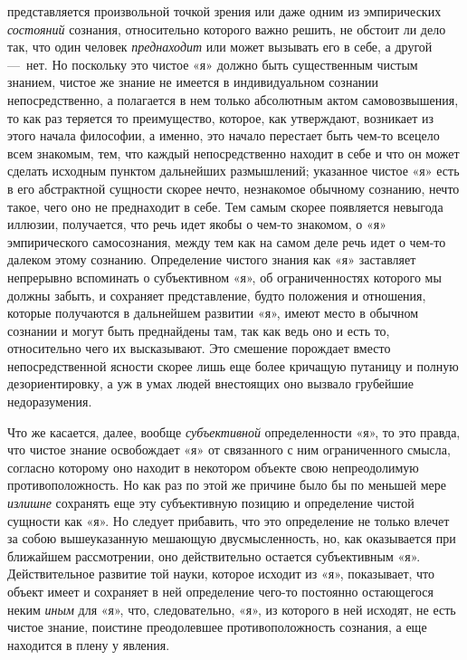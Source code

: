 представляется произвольной точкой зрения или даже одним из эмпирических
{\em состояний} сознания, относительно которого важно
решить, не обстоит ли дело так, что один человек
{\em преднаходит} или может вызывать его в себе, а
другой —~нет. Но поскольку это чистое «я» должно быть существенным чистым
знанием, чистое же знание не имеется в индивидуальном сознании
непосредственно, а полагается в нем только абсолютным актом самовозвышения,
то как раз теряется то преимущество, которое, как утверждают, возникает из
этого начала философии, а именно, это начало перестает быть чем-то всецело
всем знакомым, тем, что каждый непосредственно находит в себе и что он
может сделать исходным пунктом дальнейших размышлений; указанное чистое «я»
есть в его абстрактной сущности скорее нечто, незнакомое обычному сознанию,
нечто такое, чего оно не преднаходит в себе. Тем самым скорее появляется
невыгода иллюзии, получается, что речь идет якобы о чем-то знакомом, о «я»
эмпирического самосознания, между тем как на самом деле речь идет о чем-то
далеком этому сознанию. Определение чистого знания как «я» заставляет
непрерывно вспоминать о субъективном «я», об ограниченностях которого мы
должны забыть, и сохраняет представление, будто положения и отношения,
которые получаются в дальнейшем развитии «я», имеют место в обычном
сознании и могут быть преднайдены там, так как ведь оно и есть то,
относительно чего их высказывают. Это смешение порождает вместо
непосредственной ясности скорее лишь еще более кричащую путаницу и полную
дезориентировку, а уж в умах людей внестоящих оно вызвало грубейшие
недоразумения.

Что же касается, далее, вообще {\em субъективной}
определенности «я», то это правда, что чистое знание освобождает «я» от
связанного с ним ограниченного смысла, согласно которому оно находит в
некотором объекте свою непреодолимую противоположность. Но как раз по этой
же причине было бы по меньшей мере {\em излишне}
сохранять еще эту субъективную позицию и определение чистой сущности как
«я». Но следует прибавить, что это определение не только влечет за собою
вышеуказанную мешающую двусмысленность, но, как оказывается при ближайшем
рассмотрении, оно действительно остается субъективным «я». Действительное
развитие той науки, которое исходит из «я», показывает, что объект имеет и
сохраняет в ней определение чего-то постоянно остающегося неким
{\em иным} для «я», что, следовательно, «я», из
которого в ней исходят, не есть чистое знание, поистине преодолевшее
противоположность сознания, а еще находится в плену у явления.

